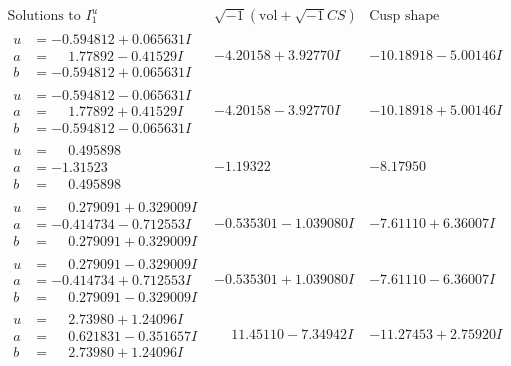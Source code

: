 \documentclass[1p]{elsarticle_modified}
\theoremstyle{definition}
\newcommand{\I}{\sqrt{-1}}
\begin{document}
$$\begin{array}{c|c|c}  
\text{Solutions to }I^u_{1}& \I (\text{vol} + \sqrt{-1}CS) & \text{Cusp shape}\\
 \hline 
\begin{aligned}
u &= -0.594812 + 0.065631 I \\
a &= \phantom{-}1.77892 - 0.41529 I \\
b &= -0.594812 + 0.065631 I\end{aligned}
 & -4.20158 + 3.92770 I & -10.18918 - 5.00146 I \\ \hline\begin{aligned}
u &= -0.594812 - 0.065631 I \\
a &= \phantom{-}1.77892 + 0.41529 I \\
b &= -0.594812 - 0.065631 I\end{aligned}
 & -4.20158 - 3.92770 I & -10.18918 + 5.00146 I \\ \hline\begin{aligned}
u &= \phantom{-}0.495898\phantom{ +0.000000I} \\
a &= -1.31523\phantom{ +0.000000I} \\
b &= \phantom{-}0.495898\phantom{ +0.000000I}\end{aligned}
 & -1.19322\phantom{ +0.000000I} & -8.17950\phantom{ +0.000000I} \\ \hline\begin{aligned}
u &= \phantom{-}0.279091 + 0.329009 I \\
a &= -0.414734 - 0.712553 I \\
b &= \phantom{-}0.279091 + 0.329009 I\end{aligned}
 & -0.535301 - 1.039080 I & -7.61110 + 6.36007 I \\ \hline\begin{aligned}
u &= \phantom{-}0.279091 - 0.329009 I \\
a &= -0.414734 + 0.712553 I \\
b &= \phantom{-}0.279091 - 0.329009 I\end{aligned}
 & -0.535301 + 1.039080 I & -7.61110 - 6.36007 I \\ \hline\begin{aligned}
u &= \phantom{-}2.73980 + 1.24096 I \\
a &= \phantom{-}0.621831 - 0.351657 I \\
b &= \phantom{-}2.73980 + 1.24096 I\end{aligned}
 & \phantom{-}11.45110 - 7.34942 I & -11.27453 + 2.75920 I \\ \hline\begin{aligned}

\end{aligned}
\end{array}$$
\end{document}
